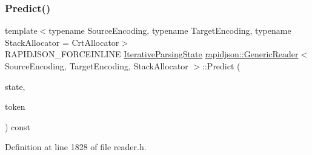 \subsubsection{\texorpdfstring{Predict()}{Predict()}}
{\footnotesize\ttfamily template$<$typename Source\+Encoding, typename Target\+Encoding, typename Stack\+Allocator = Crt\+Allocator$>$ \\
R\+A\+P\+I\+D\+J\+S\+O\+N\+\_\+\+F\+O\+R\+C\+E\+I\+N\+L\+I\+NE \mbox{\hyperlink{classrapidjson_1_1_generic_reader_a1fd8fb2f2f017d42c89a5e11cd074e1e}{Iterative\+Parsing\+State}} \mbox{\hyperlink{classrapidjson_1_1_generic_reader}{rapidjson\+::\+Generic\+Reader}}$<$ Source\+Encoding, Target\+Encoding, Stack\+Allocator $>$\+::Predict (\begin{DoxyParamCaption}\item[{\mbox{\hyperlink{classrapidjson_1_1_generic_reader_a1fd8fb2f2f017d42c89a5e11cd074e1e}{Iterative\+Parsing\+State}}}]{state,  }\item[{\mbox{\hyperlink{classrapidjson_1_1_generic_reader_a3fc870df419c60425cea2a15d36790d1}{Token}}}]{token }\end{DoxyParamCaption}) const\hspace{0.3cm}{\ttfamily [private]}}



Definition at line 1828 of file reader.\+h.


